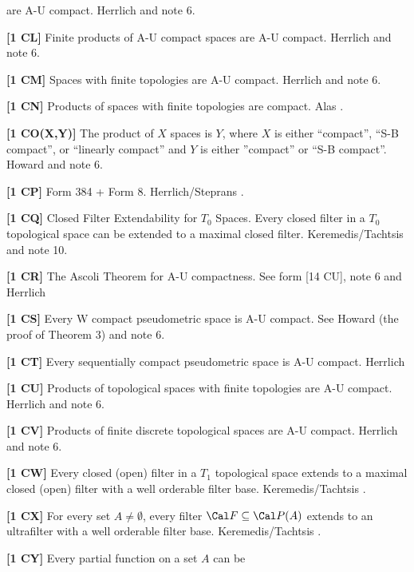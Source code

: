 are A-U compact.  \ac{Herrlich} \cite{1996a} and note 6.
\smallskip
\item{}{\bf [1 CL]} Finite products of A-U compact spaces are A-U
compact.  \ac{Herrlich} \cite{1996a} and note 6.
\smallskip
\item{}{\bf [1 CM]} Spaces with finite topologies are A-U compact.
\ac{Herrlich} \cite{1996a} and note 6.
\smallskip
\item{}{\bf [1 CN]} Products of spaces with finite topologies are
compact.  \ac{Alas} \cite{1969}.
\smallskip
\item{}{\bf [1 CO(X,Y)]} The product of $X$ spaces is $Y$,
where $X$ is either ``compact'', ``S-B compact'', or ``linearly compact''
and $Y$ is either ''compact'' or ``S-B compact''.  \ac{Howard}
\cite{1990} and note 6.
\smallskip
\item{}{\bf [1 CP]} Form 384 + Form 8.  \ac{Herrlich/Steprans}
\cite{1997}.
\smallskip
\item{}{\bf [1 CQ]} Closed Filter Extendability for $T_0$ Spaces.
Every closed filter in a $T_0$ topological space can be extended to
a maximal closed filter.  \ac{Keremedis/Tachtsis} \cite{1999b} and note
10.
\smallskip
\item{}{\bf [1 CR]} The Ascoli Theorem for A-U compactness. See form
[14 CU], note 6 and \ac{Herrlich} \cite{1997c}
\smallskip
\item{}{\bf [1 CS]} Every W compact pseudometric space is A-U compact.
See \ac{Howard} \cite{1990} (the proof of Theorem 3) and note 6.
\smallskip
\item{}{\bf [1 CT]} Every sequentially compact pseudometric space is
A-U compact.  \ac{Herrlich} \cite{1997a}
\smallskip
\item{}{\bf [1 CU]} Products of topological spaces with finite topologies
are A-U compact.  \ac{Herrlich} \cite{1997a} and note 6.
\smallskip
\item{}{\bf [1 CV]} Products of finite discrete topological spaces are
A-U compact. \ac{Herrlich} \cite{1996a} and note 6.
\smallskip
\item{}{\bf [1 CW]} Every closed (open) filter in a $T_1$ topological
space extends to a maximal closed (open) filter with a well orderable
filter base.  \ac{Keremedis/Tachtsis} \cite{2000}.
\smallskip
\item{}{\bf [1 CX]} For every set $A\ne\emptyset$, every filter $\Cal F
\subseteq \Cal P(A)$ extends to an ultrafilter with a well orderable
filter base.  \ac{Keremedis/Tachtsis} \cite{2000}.
\smallskip
\item{}{\bf [1 CY]} Every partial function on a set $A$ can be
